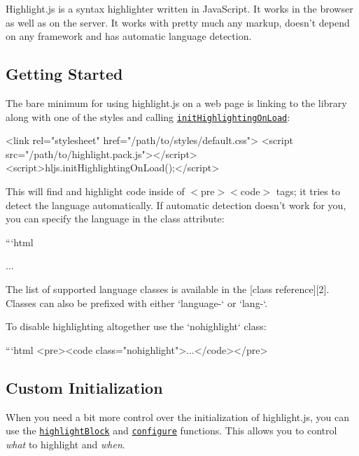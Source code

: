 \href{https://travis-ci.org/isagalaev/highlight.js}{\tt }

Highlight.\+js is a syntax highlighter written in Java\+Script. It works in the browser as well as on the server. It works with pretty much any markup, doesn’t depend on any framework and has automatic language detection.

\subsection*{Getting Started}

The bare minimum for using highlight.\+js on a web page is linking to the library along with one of the styles and calling \href{http://highlightjs.readthedocs.io/en/latest/api.html#inithighlightingonload}{\tt {\ttfamily init\+Highlighting\+On\+Load}}\+:


\begin{DoxyCode}
<link rel="stylesheet" href="/path/to/styles/default.css">
<script src="/path/to/highlight.pack.js"></script>
<script>hljs.initHighlightingOnLoad();</script>
\end{DoxyCode}


This will find and highlight code inside of {\ttfamily $<$pre$>$$<$code$>$} tags; it tries to detect the language automatically. If automatic detection doesn’t work for you, you can specify the language in the {\ttfamily class} attribute\+:

```html 
\begin{DoxyPre}{\ttfamily ...}\end{DoxyPre}
 
\begin{DoxyCode}
The list of supported language classes is available in the [class
reference][2].  Classes can also be prefixed with either `language-` or
`lang-`.

To disable highlighting altogether use the `nohighlight` class:

```html
<pre><code class="nohighlight">...</code></pre>
\end{DoxyCode}


\subsection*{Custom Initialization}

When you need a bit more control over the initialization of highlight.\+js, you can use the \href{http://highlightjs.readthedocs.io/en/latest/api.html#highlightblock-block}{\tt {\ttfamily highlight\+Block}} and \href{http://highlightjs.readthedocs.io/en/latest/api.html#configure-options}{\tt {\ttfamily configure}} functions. This allows you to control {\itshape what} to highlight and {\itshape when}.

